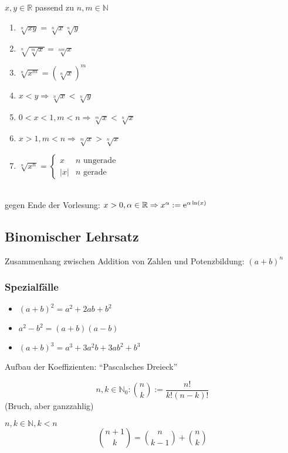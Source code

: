 $x,y \in \mathbb{R}$ passend zu $n,m \in\mathbb{N}$
\begin{enumerate}
 \item $\sqrt[n]{xy} = \sqrt[n]x \sqrt[n]y$
 \item $\sqrt[n]{\sqrt[m]x} = \sqrt[nm]x$
 \item $\sqrt[n]{x^m} = (\sqrt[n]x)^m$
 \item $x<y \Rightarrow \sqrt[n]x < \sqrt[n]y$
 \item $0<x<1, m<n \Rightarrow \sqrt[m]{x} < \sqrt[n]{x}$
 \item $x>1, m<n \Rightarrow \sqrt[m]x > \sqrt[n]x$
 \item $\sqrt[n]{x^n} = \begin{cases} x & n \text{ ungerade} \\ |x| & n \text{ gerade} \end{cases}$
\end{enumerate}
\induction\\
gegen Ende der Vorlesung: $x > 0, \alpha \in \mathbb{R} \Rightarrow x^\alpha := \operatorname{e}^{\alpha \operatorname{ln}(x)}$

\subsection{Binomischer Lehrsatz}

Zusammenhang zwischen Addition von Zahlen und Potenzbildung: $(a+b)^n$

\subsubsection*{Spezialfälle}

\begin{itemize}
 \item $(a+b)^2 = a^2+2ab+b^2$
 \item $a^2-b^2 = (a+b)(a-b)$
 \item $(a+b)^3=a^3+3a^2b+3ab^2+b^3$
\end{itemize}
%
Aufbau der Koeffizienten: "`Pascalsches Dreieck"'

\begin{definition}
 \[ n,k \in \mathbb{N}_0: {n \choose k} := \frac{n!}{k!(n-k)!} \]
 (Bruch, aber ganzzahlig)
\end{definition}

\begin{proposition} $n,k \in \mathbb{N}, k < n$
  \[ {n+1 \choose k} = {n \choose k-1} + {n \choose k} \]
\end{proposition}

